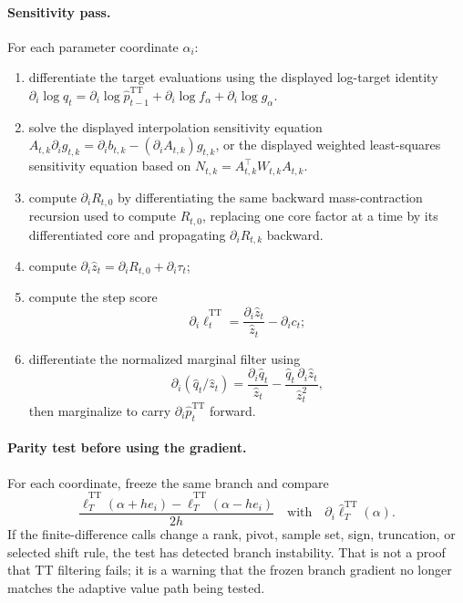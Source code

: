 \documentclass[11pt]{article}
\newcommand{\TT}{\mathrm{TT}}
\theoremstyle{definition}
\theoremstyle{remark}
\begin{document}
\paragraph{Sensitivity pass.}
For each parameter coordinate \(\alpha_i\):
\begin{enumerate}[leftmargin=*]
\item differentiate the target evaluations using the displayed log-target
  identity
  \(\partial_i\log q_t
  =
  \partial_i\log\widehat p_{t-1}^{\TT}
  +\partial_i\log f_\alpha+\partial_i\log g_\alpha\).
\item solve the displayed interpolation sensitivity equation
  \(A_{t,k}\partial_i g_{t,k}
  =
  \partial_i b_{t,k}-(\partial_iA_{t,k})g_{t,k}\), or the displayed weighted
  least-squares sensitivity equation based on
  \(N_{t,k}=A_{t,k}^{\top}W_{t,k}A_{t,k}\).
\item compute \(\partial_iR_{t,0}\) by differentiating the same backward
  mass-contraction recursion used to compute \(R_{t,0}\), replacing one core
  factor at a time by its differentiated core and propagating
  \(\partial_iR_{t,k}\) backward.
\item compute \(\partial_i\widehat z_t=\partial_iR_{t,0}+\partial_i\tau_t\);
\item compute the step score
  \[
    \partial_i\widehat\ell_t^{\TT}
    =
    \frac{\partial_i\widehat z_t}{\widehat z_t}
    -
    \partial_i c_t;
  \]
\item differentiate the normalized marginal filter using
  \[
    \partial_i(\widehat q_t/\widehat z_t)
    =
    \frac{\partial_i\widehat q_t}{\widehat z_t}
    -
    \frac{\widehat q_t\,\partial_i\widehat z_t}{\widehat z_t^2},
  \]
  then marginalize to carry \(\partial_i\widehat p_t^{\TT}\) forward.
\end{enumerate}

\paragraph{Parity test before using the gradient.}
For each coordinate, freeze the same branch and compare
\[
  \frac{
  \widehat\ell_T^{\TT}(\alpha+h e_i)
  -
  \widehat\ell_T^{\TT}(\alpha-h e_i)}
  {2h}
  \quad\text{with}\quad
  \partial_i\widehat\ell_T^{\TT}(\alpha).
\]
If the finite-difference calls change a rank, pivot, sample set, sign,
truncation, or selected shift rule, the test has detected branch instability.
That is not a proof that TT filtering fails; it is a warning that the frozen
branch gradient no longer matches the adaptive value path being tested.
\end{document}
